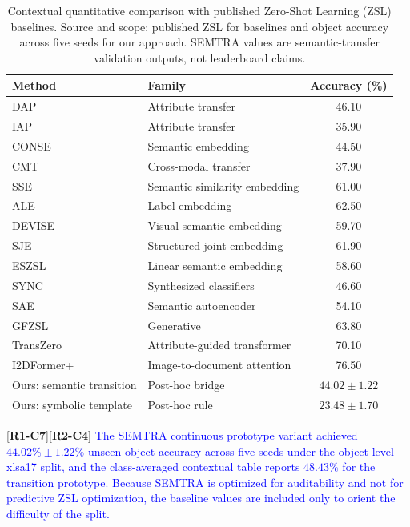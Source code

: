 \documentclass[make,article,submit,pdftex,moreauthors]{Definitions/mdpi}
\newcommand{\revtag}[2]{[\textbf{R#1-C#2}]}
\newcommand{\Rone}[1]{\textcolor{red}{#1}}
\newcommand{\Rtwo}[1]{\textcolor{blue}{#1}}
\begin{document}
\begin{table}[!ht]
\caption{Contextual quantitative comparison with published Zero-Shot Learning (ZSL) baselines. Source and scope: published ZSL for baselines and object accuracy across five seeds for our approach. SEMTRA values are semantic-transfer validation outputs, not leaderboard claims. \label{tab:sota_quantitative_comparison}}
\centering
\begin{tabularx}{\textwidth}{L L c}
\toprule
\textbf{Method} & \textbf{Family} & \textbf{Accuracy (\%)} \\
\midrule
DAP~\cite{Lampert2009Attribute} & Attribute transfer & 46.10 \\
IAP~\cite{Lampert2014Attribute} & Attribute transfer & 35.90 \\
CONSE~\cite{Norouzi2014ConSE} & Semantic embedding & 44.50 \\
CMT~\cite{Socher2013CMT} & Cross-modal transfer & 37.90 \\
SSE~\cite{Zhang2015SSE} & Semantic similarity embedding & 61.00 \\
ALE~\cite{Akata2016ALE} & Label embedding & 62.50 \\
DEVISE~\cite{Frome2013DeViSE} & Visual-semantic embedding & 59.70 \\
SJE~\cite{Akata2015SJE} & Structured joint embedding & 61.90 \\
ESZSL~\cite{RomeraParedes2015ESZSL} & Linear semantic embedding & 58.60 \\
SYNC~\cite{Changpinyo2016SYNC} & Synthesized classifiers & 46.60 \\
SAE~\cite{Kodirov2017SAE} & Semantic autoencoder & 54.10 \\
GFZSL~\cite{Verma2017GFZSL} & Generative & 63.80 \\
TransZero~\cite{Chen2022TransZero} & Attribute-guided transformer & 70.10 \\
I2DFormer+~\cite{Naeem2024I2DFormer} & Image-to-document attention & 76.50 \\
Ours: semantic transition & Post-hoc bridge & $44.02 \pm 1.22$ \\
Ours: symbolic template & Post-hoc rule & $23.48 \pm 1.70$ \\
\bottomrule
\end{tabularx}
\end{table}

\revtag{1}{7}\revtag{2}{4} \Rone{\Rtwo{The SEMTRA continuous prototype variant achieved $44.02\% \pm 1.22\%$ unseen-object accuracy across five seeds under the object-level xlsa17 split, and the class-averaged contextual table reports $48.43\%$ for the transition prototype. Because SEMTRA is optimized for auditability and not for predictive ZSL optimization, the baseline values are included only to orient the difficulty of the split.}}
\end{document}
